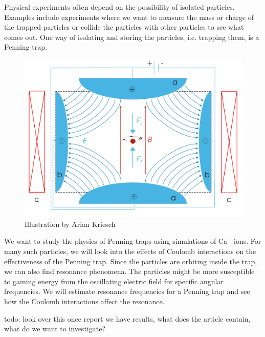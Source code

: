 Physical experiments often depend on the
possibility of isolated particles. Examples include experiments where we want to measure the mass or charge of the
trapped particles or collide the particles with
other particles to see what comes out. One way of isolating and
storing the particles, i.e. trapping them, is a Penning trap.

\begin{figure}
  \centering
  \includegraphics[scale=0.5]{figures/Penning_Trap.pdf}
  \caption{Illustration by Arian Kriesch}%
  \label{fig:penning}
\end{figure}

We want to study the physics of Penning traps using simulations of Ca$^+$-ions.
For many such particles, we will look into the effects of Coulomb interactions on the effectiveness
of the Penning trap. Since the particles are orbiting inside the trap, we can also find resonance
phenomena. The particles might be more susceptible to gaining energy
from the oscillating electric field for specific angular frequencies. We will estimate resonance frequencies for a Penning
trap and see how the Coulomb interactions affect the resonance.

todo: look over this once report we have results, what does the article contain, what do we want to
investigate?

